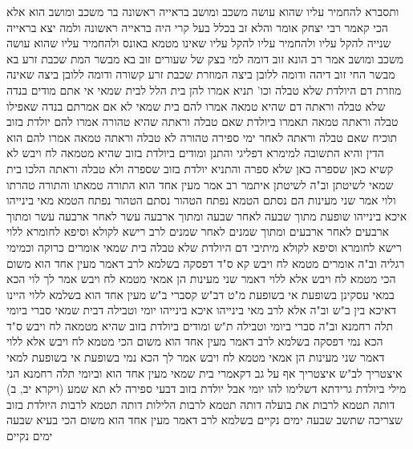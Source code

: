 \documentclass[12pt, openany]{book}
\begin{document}
{ותסברא להחמיר עליו שהוא עושה משכב ומושב בראייה ראשונה בר משכב ומושב הוא 
אלא הכי קאמר רבי יצחק אומר והלא זב בכלל בעל קרי היה בראייה ראשונה ולמה יצא בראייה שנייה להקל עליו ולהחמיר עליו להקל עליו שאינו מטמא באונס ולהחמיר עליו שהוא עושה משכב ומושב 
אמר רב הונא זוב דומה למי בצק של שעורים זוב בא מבשר המת שכבת זרע בא מבשר החי זוב דיהה ודומה ללובן ביצה המוזרת שכבת זרע קשורה ודומה ללובן ביצה שאינה מוזרת
דם היולדת שלא טבלה וכו'
תניא אמרו להן בית הלל לבית שמאי אי אתם מודים בנדה שלא טבלה וראתה דם שהיא טמאה אמרו להם בית שמאי לא אם אמרתם בנדה שאפילו טבלה וראתה טמאה תאמרו ביולדת שאם טבלה וראתה שהיא טהורה 
אמרו להם יולדת בזוב תוכיח שאם טבלה וראתה לאחר ימי ספירה טהורה לא טבלה וראתה טמאה 
אמרו להם הוא הדין והיא התשובה 
למימרא דפליגי והתנן ומודים ביולדת בזוב שהיא מטמאה לח ויבש 
לא קשיא כאן שספרה כאן שלא ספרה 
והתניא יולדת בזוב שספרה ולא טבלה וראתה הלכו בית שמאי לשיטתן וב"ה לשיטתן 
איתמר רב אמר מעין אחד הוא התורה טמאתו והתורה טהרתו 
ולוי אמר שני מעינות הם נסתם הטמא נפתח הטהור נסתם הטהור נפתח הטמא 
מאי בינייהו איכא בינייהו שופעת מתוך שבעה לאחר שבעה ומתוך ארבעה עשר לאחר ארבעה עשר ומתוך ארבעים לאחר ארבעים ומתוך שמנים לאחר שמנים
לרב רישא לקולא וסיפא לחומרא
ללוי רישא לחומרא וסיפא לקולא 
מיתיבי דם היולדת שלא טבלה בית שמאי אומרים כרוקה וכמימי רגליה וב"ה אומרים מטמא לח ויבש 
קא ס"ד דפסקה בשלמא לרב דאמר מעין אחד הוא משום הכי מטמא לח ויבש אלא ללוי דאמר שני מעינות הן אמאי מטמא לח ויבש 
אמר לך לוי הכא במאי עסקינן בשופעת אי בשופעת מ"ט דב"ש קסברי ב"ש מעין אחד הוא 
בשלמא ללוי היינו דאיכא בין ב"ש וב"ה אלא לרב מאי בינייהו 
איכא בינייהו יומי וטבילה דבית שמאי סברי ביומי תלה רחמנא וב"ה סברי ביומי וטבילה 
ת"ש ומודים ביולדת בזוב שהיא מטמאה לח ויבש ס"ד הכא נמי דפסקה
בשלמא לרב דאמר מעין אחד הוא משום הכי מטמא לח ויבש אלא ללוי דאמר שני מעינות הן אמאי מטמא לח ויבש 
אמר לך הכא נמי בשופעת אי בשופעת למאי איצטריך 
לב"ש איצטריך אף על גב דקאמרי בית שמאי מעין אחד הוא וביומי תלה רחמנא הני מילי ביולדת גרידתא דשלימו להו יומי אבל יולדת בזוב דבעי ספירה לא 
תא שמע (ויקרא יב, ב) דותה תטמא לרבות את בועלה
דותה תטמא לרבות הלילות דותה תטמא לרבות היולדת בזוב שצריכה שתשב שבעה ימים נקיים בשלמא לרב דאמר מעין אחד הוא משום הכי בעיא שבעה ימים נקיים}
\end{document}
